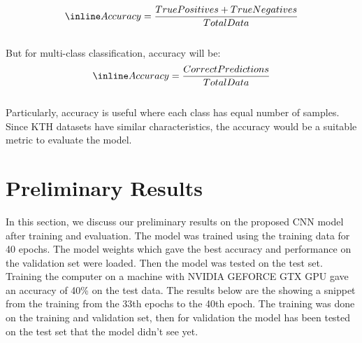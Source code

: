\[\inline \large Accuracy = \frac{True Positives+True Negatives}{Total Data}\]\\

But for multi-class classification, accuracy will be:
\[\inline \large Accuracy = \frac{Correct Predictions}{Total Data}\]\\

Particularly, accuracy is useful where each class has equal number of samples. Since KTH datasets have similar characteristics, the accuracy would be a suitable metric to evaluate the model.
\section {Preliminary Results}
\hspace{5mm} In this section, we discuss our preliminary results on the proposed CNN model after training and evaluation. The model was trained using the training data for 40 epochs. The model weights which gave the best accuracy and performance on the validation set were loaded. Then the model was tested on the test set. Training the computer on a machine with NVIDIA GEFORCE GTX GPU gave an accuracy of 40\% on the test data.
The results below are the showing a snippet from the training from the 33th epochs to the 40th epoch. The training was done on the training and validation set, then for validation the model has been tested on the test set that the model didn’t see yet.\\

